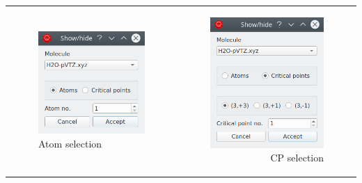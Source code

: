\documentclass[10pt]{article}
\begin{document}
\hspace*{-5mm}
\begin{tabular}{lr}
\begin{minipage}{.5\linewidth}
    \begin{figure}[H]
        \begin{center}
            \includegraphics[width=0.5\linewidth]{damqt320_atom_toggle_selection.png}
        \end{center}
        \vspace*{8mm}
        \caption{Atom selection \label{fig:4_14_1}}
    \end{figure}
\end{minipage}
&
\begin{minipage}{.5\linewidth}
    \begin{figure}[H]
        \begin{center}
            \includegraphics[width=0.5\linewidth]{damqt320_CP_toggle_selection.png} 
        \end{center}
        \vspace*{-0.5mm}
        \caption{CP selection \label{fig:4_14_2}}
    \end{figure}
\end{minipage}
\end{tabular}
\vspace*{5mm}
\end{document}
